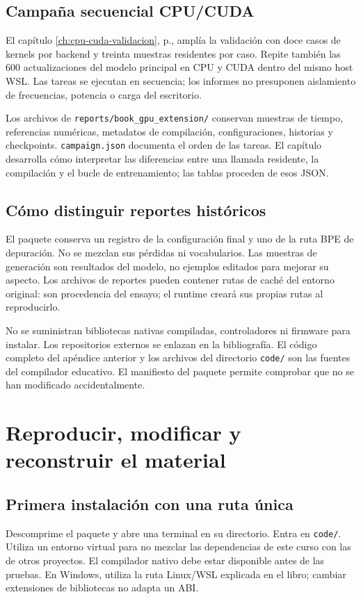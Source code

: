 \section{Campaña secuencial CPU/CUDA}
El capítulo \ref{ch:cpu-cuda-validacion}, p.\pageref{ch:cpu-cuda-validacion}, amplía la validación con doce casos de kernels por backend y treinta muestras residentes por caso. Repite también las 600 actualizaciones del modelo principal en CPU y CUDA dentro del mismo host WSL. Las tareas se ejecutan en secuencia; los informes no presuponen aislamiento de frecuencias, potencia o carga del escritorio.

Los archivos de \texttt{reports/book\_gpu\_extension/} conservan muestras de tiempo, referencias numéricas, metadatos de compilación, configuraciones, historias y checkpoints. \texttt{campaign.json} documenta el orden de las tareas. El capítulo desarrolla cómo interpretar las diferencias entre una llamada residente, la compilación y el bucle de entrenamiento; las tablas proceden de esos JSON.

\section{Cómo distinguir reportes históricos}
El paquete conserva un registro de la configuración final y uno de la ruta BPE de depuración. No se mezclan sus pérdidas ni vocabularios. Las muestras de generación son resultados del modelo, no ejemplos editados para mejorar su aspecto. Los archivos de reportes pueden contener rutas de caché del entorno original: son procedencia del ensayo; el runtime creará sus propias rutas al reproducirlo.

No se suministran bibliotecas nativas compiladas, controladores ni firmware para instalar. Los repositorios externos se enlazan en la bibliografía. El código completo del apéndice anterior y los archivos del directorio \texttt{code/} son las fuentes del compilador educativo. El manifiesto del paquete permite comprobar que no se han modificado accidentalmente.

\chapter{Reproducir, modificar y reconstruir el material}\label{app:reproducir}

\section{Primera instalación con una ruta única}
Descomprime el paquete y abre una terminal en su directorio. Entra en \texttt{code/}. Utiliza un entorno virtual para no mezclar las dependencias de este curso con las de otros proyectos. El compilador nativo debe estar disponible antes de las pruebas. En Windows, utiliza la ruta Linux/WSL explicada en el libro; cambiar extensiones de bibliotecas no adapta un ABI.

